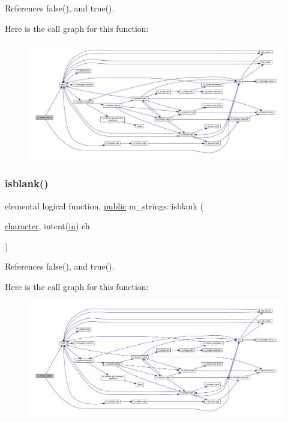References false(), and true().

Here is the call graph for this function\+:
\nopagebreak
\begin{figure}[H]
\begin{center}
\leavevmode
\includegraphics[width=350pt]{namespacem__strings_afb63e9fefbc04e4e9a2ec4df4334078c_cgraph}
\end{center}
\end{figure}
\mbox{\label{namespacem__strings_aebb074d3971c0b93e39d1cfaa45658d8}} 
\subsubsection{\texorpdfstring{isblank()}{isblank()}}
{\footnotesize\ttfamily elemental logical function, \hyperlink{M__stopwatch_83_8txt_a2f74811300c361e53b430611a7d1769f}{public} m\+\_\+strings\+::isblank (\begin{DoxyParamCaption}\item[{\hyperlink{option__stopwatch_83_8txt_abd4b21fbbd175834027b5224bfe97e66}{character}, intent(\hyperlink{M__journal_83_8txt_afce72651d1eed785a2132bee863b2f38}{in})}]{ch }\end{DoxyParamCaption})}



References false(), and true().

Here is the call graph for this function\+:
\nopagebreak
\begin{figure}[H]
\begin{center}
\leavevmode
\includegraphics[width=350pt]{namespacem__strings_aebb074d3971c0b93e39d1cfaa45658d8_cgraph}
\end{center}
\end{figure}
\mbox{\label{namespacem__strings_a4821cb5a5c4024c9dc6dd159300034ca}} 
